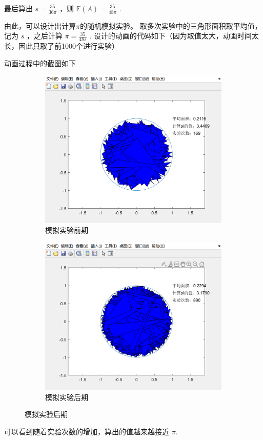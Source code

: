 \documentclass[12pt]{ctexart}
\begin{document}
\vspace{1em}
最后算出 $s=\frac{35}{36\pi}$ ，则 $\mathbb{E}(A)=\frac{35}{48\pi}$ .

由此，可以设计出计算$\pi$的随机模拟实验。
取多次实验中的三角形面积取平均值，记为 $s$ ，之后计算 $\pi=\frac{35}{48s}$ .
设计的动画的代码如下（因为取值太大，动画时间太长，因此只取了前1000个进行实验）



动画过程中的截图如下

\begin{figure}[h!]
    \begin{subfigure}[h!]{0.4\textwidth}
        \includegraphics[width=0.9\linewidth]{./figure/task2_2.png}
        \caption{模拟实验前期}
    \end{subfigure}
    \begin{subfigure}[h!]{0.5\textwidth}
        \includegraphics[width=0.9\linewidth]{./figure/task2_2b.png}
        \caption{模拟实验后期}
    \end{subfigure}
\end{figure}
可以看到随着实验次数的增加，算出的值越来越接近 $\pi$.
\end{document}
